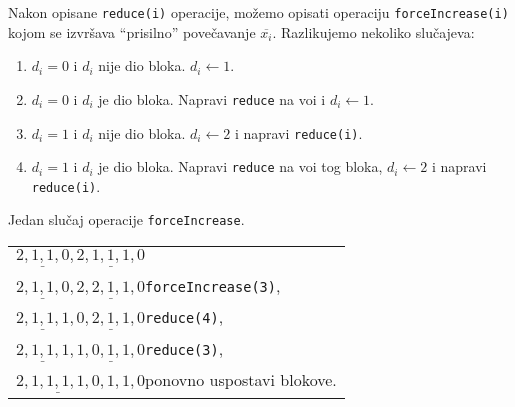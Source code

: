 Nakon opisane \texttt{reduce(i)} operacije, mo\v{z}emo opisati operaciju \texttt{forceIncrease(i)} kojom se izvr\v{s}ava ``prisilno'' pove\v{c}avanje $\overline{x_{i}}$.
Razlikujemo nekoliko slu\v{c}ajeva:
\begin{enumerate}
  \item $d_{i} = 0$ i $d_{i}$ nije dio bloka. $d_{i} \leftarrow 1$.
  \item $d_{i} = 0$ i $d_{i}$ je dio bloka. Napravi \texttt{reduce} na vo\dj i i $d_{i} \leftarrow 1$.
  \item $d_{i} = 1$ i $d_{i}$ nije dio bloka. $d_{i} \leftarrow 2$ i napravi \texttt{reduce(i)}.
  \item $d_{i} = 1$ i $d_{i}$ je dio bloka. Napravi \texttt{reduce} na vo\dj i tog bloka, $d_{i} \leftarrow 2$ i napravi \texttt{reduce(i)}.
\end{enumerate}

\begin{exa}
  Jedan slu\v{c}aj operacije \texttt{forceIncrease}.
  \begin{center}
    \begin{tabular}{l}
      $\underline{2,1,1,0},\underline{2,1,1,1,0}$\\
      $\underline{2,1,1,0},\underline{2,2,1,1,0}$\qquad \texttt{forceIncrease(3)},\\
      $\underline{2,1,1,1},\underline{0,2,1,1,0}$\qquad \texttt{reduce(4)},\\
      $\underline{2,1,1,1},\underline{1,0,1,1,0}$\qquad \texttt{reduce(3)},\\
      $\underline{2,1,1,1,1,0},1,1,0$\qquad ponovno uspostavi blokove.\\
    \end{tabular}
  \end{center}
\end{exa}
